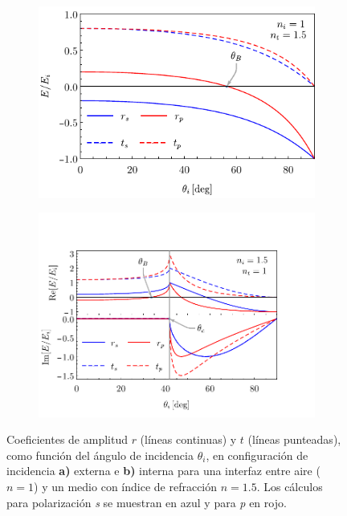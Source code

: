 \begin{figure}[h!]\centering
	\begin{subfigure}{.05\textwidth}\vspace{-4.75cm}\caption{}\label{sfig:coefExt}\end{subfigure}
	\begin{subfigure}{.43\textwidth} \hspace*{-1cm}
	\includegraphics[scale=1,trim={00 00 00 00}, clip]{1-Teoria/figs/0-ampCoefExt}
	\end{subfigure}
	\begin{subfigure}{.05\textwidth}\vspace{-4.75cm}\caption{}\label{sfig:coefInt}\end{subfigure}
	\begin{subfigure}{.43\textwidth} \hspace*{-.9cm}
	\includegraphics[scale=.7,trim={00 10 50 50 }, clip]{1-Teoria/figs/0-ampCoefInt}
	\end{subfigure}\vspace*{-.7em}
	\caption{ Coeficientes de amplitud $r$ (líneas continuas) y $t$ (líneas punteadas), como función del ángulo de incidencia $\theta_i$, en configuración de incidencia \textbf{a)} externa e \textbf{b)} interna para una interfaz entre  aire ($n=1$) y un medio con índice de refracción $n = 1.5$. Los cálculos para polarización  \emph{s} se muestran  en azul y  para \emph{p} en rojo. }	\label{fig:coefAmp}	
	\end{figure}	
%

